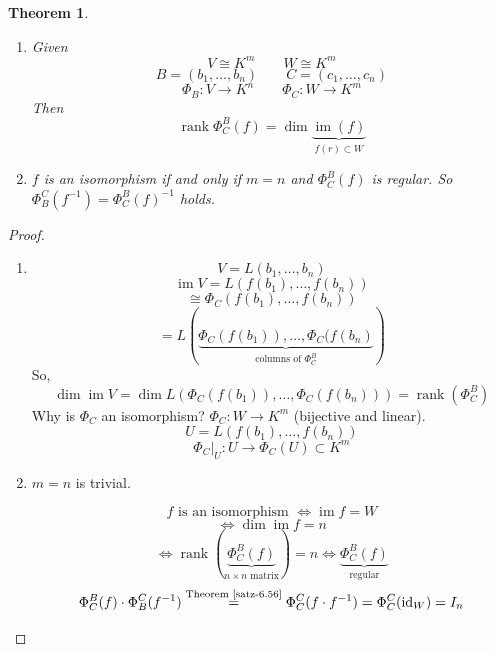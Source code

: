 \documentclass[a4paper,landscape,twocolumn]{article}
\newtheorem{theorem}{Theorem}
\DeclareMathOperator\image{im} %
\DeclareMathOperator\rank{rank} %
\begin{document}
\begin{theorem}
  \label{satz-6.57}
  \begin{enumerate}
    \item
      Given
      \[ V \cong K^m \qquad W \cong K^m \]
      \[ B = (b_1, \ldots, b_n)  \qquad  C = (c_1, \ldots, c_n)  \]
      \[ \Phi_B:  V \to K^n \qquad \Phi_C: W \to K^m \]
      Then
      \[ \rank{\Phi_C^B(f)} = \dim{\underbrace{\image(f)}_{f(r) \subset W}} \]
    \item
      $f$ is an isomorphism if and only if $m = n$ and $\Phi_C^B(f)$ is regular.
      So $\Phi_B^C(f^{-1}) = \Phi_C^B(f)^{-1}$ holds.
  \end{enumerate}
\end{theorem}
\begin{proof}
  \begin{enumerate}
    \item
      \[ V = L(b_1, \ldots, b_n) \]
      \[ \image{V} = L(f(b_1), \ldots, f(b_n)) \]
      \[ \cong \Phi_C(f(b_1), \ldots, f(b_n)) \]
      \[ = L(\underbrace{\Phi_C(f(b_1)), \ldots, \Phi_C(f(b_n)}_{\text{columns of } \Phi_C^B}) \]
      So,
      \[ \dim{\image{V}} = \dim{L(\Phi_C(f(b_1)), \ldots, \Phi_C(f(b_n)))} = \rank(\Phi_C^B) \]
      Why is $\Phi_C$ an isomorphism? $\Phi_C: W \to K^m$ (bijective and linear).
      \[ U = L(f(b_1), \ldots, f(b_n)) \]
      \[ \left.\Phi_C\right|_U: U \to \Phi_C(U) \subset K^m \]
    \item
      $m = n$ is trivial.

      \[ f \text{ is an isomorphism } \Leftrightarrow \image{f} = W \]
      \[ \Leftrightarrow \dim{\image{f}} = n \]
      \[
        \Leftrightarrow
        \rank\left(\underbrace{\Phi_C^B(f)}_{n\times n \text{ matrix}}\right)
        = n \Leftrightarrow \underbrace{\Phi_C^B(f)}_{\text{regular}}
      \] \[
        \Phi_C^B(f) \cdot \Phi_B^C(f^{-1})
          \overset{\text{Theorem~\ref{satz-6.56}}}{=} \Phi_C^C(f \cdot f^{-1})
          = \Phi_C^C(\text{id}_W)
          = I_n
      \]
  \end{enumerate}
\end{proof}
\end{document}

